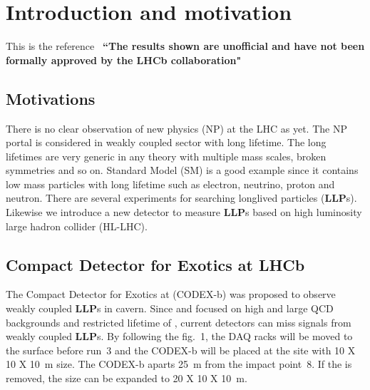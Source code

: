 \section{Introduction and motivation}
\label{sec:Introduction}

This is the reference~\cite{Gligorov:2017nwh}
\newline
\textbf{``The results shown are unofficial and have not been formally approved by the LHCb collaboration"}

\subsection{Motivations}

There is no clear observation of new physics (NP) at the LHC as yet. The NP portal is considered in weakly coupled sector with long lifetime. 
The long lifetimes are very generic in any theory with multiple mass scales, broken symmetries and so on. 
Standard Model (SM) is a good example since it contains low mass particles with long lifetime such as electron, neutrino, proton and neutron.
There are several experiments for searching longlived particles (\textbf{LLP}s). 
Likewise we introduce a new detector to measure \textbf{LLP}s based on high luminosity large hadron collider (HL-LHC).

\subsection{Compact Detector for Exotics at LHCb}

The Compact Detector for Exotics at \lhcb (CODEX-b) was proposed to observe weakly coupled \textbf{LLP}s in \lhcb cavern. 
Since \atlas and \cms focused on high \pt and large QCD backgrounds and restricted lifetime of \lhcb, current detectors can miss signals from weakly coupled \textbf{LLP}s. 
By following the fig.~1, the DAQ racks will be moved to the surface before run~3 and the CODEX-b will be placed at the site with 10 X 10 X 10~m size. 
The CODEX-b aparts 25~m from the impact point~8. 
If the \delphi is removed, the size can be expanded to 20 X 10 X 10~m.

